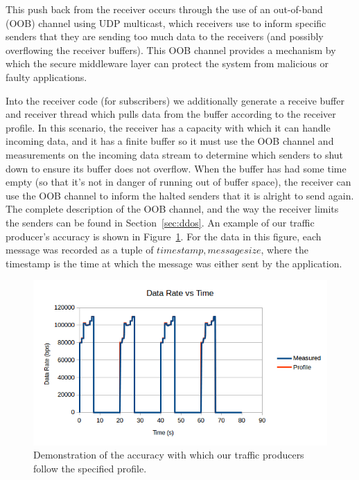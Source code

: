 This push back from the receiver occurs through the use of an
out-of-band (OOB) channel using UDP multicast, which receivers use to
inform specific senders that they are sending too much data to the
receivers (and possibly overflowing the receiver buffers).  This OOB
channel provides a mechanism by which the secure middleware layer can
protect the system from malicious or faulty applications.

Into the receiver code (for subscribers) we additionally generate a
receive buffer and receiver thread which pulls data from the buffer
according to the receiver profile.  In this scenario, the receiver has
a capacity with which it can handle incoming data, and it has a finite
buffer so it must use the OOB channel and measurements on the incoming
data stream to determine which senders to shut down to ensure its
buffer does not overflow.  When the buffer has had some time empty (so
that it's not in danger of running out of buffer space), the receiver
can use the OOB channel to inform the halted senders that it is
alright to send again.  The complete description of the OOB channel,
and the way the receiver limits the senders can be found in
Section~\ref{sec:ddos}.  An example of our traffic producer's accuracy
is shown in Figure~\ref{fig:generation}.  For the data in this figure,
each message was recorded as a tuple of $timestamp, message size$,
where the timestamp is the time at which the message was either sent
by the application.

\begin{figure}[ht!]
  \includegraphics[width=1.1\textwidth]{../doc/src/images/results/traffic_generation.png}
  \caption{Demonstration of the accuracy with which our traffic
    producers follow the specified profile.}
  \label{fig:generation}
\end{figure}

